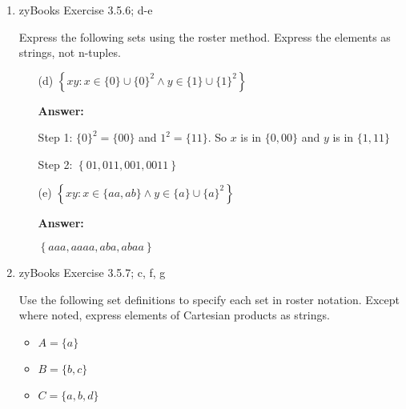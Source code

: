 \documentclass[14pt]{extreport}
\newcommand{\answer}[0]{\medskip \textbf{Answer:} \medskip}
\newcommand{\union}[0]{\cup}
\begin{document}
\begin{enumerate}
\begin{enumerate}
                \answer

                True, since an \( n \)-tuple of size 2 does not equal an \( n \)-tuple of size 3.

            \item[(e)] For any three sets \( A, B, C \), if \( A \subseteq B \), then \( A \times C \subseteq B \times C \)
            
                \answer

                True, since if \( A \subseteq B \) then every element of \( A \) is in \( B \). 

        \end{enumerate}

    \item zyBooks Exercise 3.5.6; d-e
    
    Express the following sets using the roster method. Express the elements as strings, not n-tuples.
    
        \begin{enumerate}

            \item[(d)] \( \left\{ xy: x \in \{0\} \union \{0\}^2 \land y \in \{1\} \union \{1\}^2 \right\} \)
            
                \answer

                Step 1: \( \{0\}^2 = \{00\} \) and \( {1}^2 = \{11\} \). So \( x \) is in \( \{0, 00\} \) and \( y \) is in \( \{1, 11\} \)

                \medskip

                Step 2: \( \left\{ 01, 011, 001, 0011 \right\} \)

            \item[(e)] \( \left\{ xy: x \in \{aa, ab\} \land y \in \{a\} \union \{a\}^2 \right\} \)
            
                \answer

                \( \left\{ aaa, aaaa, aba, abaa \right\} \)

        \end{enumerate}

    \item zyBooks Exercise 3.5.7; c, f, g
    
    Use the following set definitions to specify each set in roster notation. Except where noted, express elements of Cartesian products as strings.
    \begin{itemize}
        \item \( A = \{a\} \)
        \item \( B = \{b, c\} \)
        \item \( C = \{a, b, d\} \)
    \end{itemize}


\end{enumerate}
\end{document}
